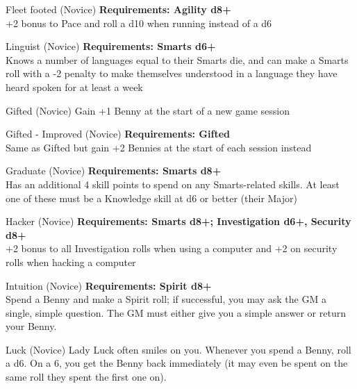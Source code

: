 \begin{multicols}{2}
\begin{genericsection}{Fleet footed (Novice)}
\textbf{Requirements: Agility d8+}\\
+2 bonus to Pace and roll a d10 when running instead of a d6
\end{genericsection}

\begin{genericsection}{Linguist (Novice)}
\textbf{Requirements: Smarts d6+}\\
Knows a number of languages equal to their Smarts die, and can make a Smarts roll with a -2 penalty to make themselves understood in a language they have heard spoken for at least a week
\end{genericsection}

\begin{genericsection}{Gifted (Novice)}
Gain +1 Benny at the start of a new game session
\end{genericsection}

\begin{genericsection}{Gifted - Improved (Novice)}
\textbf{Requirements: Gifted}\\
Same as Gifted but gain +2 Bennies at the start of each session instead
\end{genericsection}

\begin{genericsection}{Graduate (Novice)}
\textbf{Requirements: Smarts d8+}\\
Has an additional 4 skill points to spend on any Smarts-related skills. At least one of these must be a Knowledge skill at d6 or better (their Major)
\end{genericsection}

\begin{genericsection}{Hacker (Novice)}
\textbf{Requirements: Smarts d8+; Investigation d6+, Security d8+}\\
+2 bonus to all Investigation rolls when using a computer and +2 on security rolls when hacking a computer
\end{genericsection}

\begin{genericsection}{Intuition (Novice)}
\textbf{Requirements: Spirit d8+}\\
Spend a Benny and make a Spirit roll; if successful, you may ask the GM a single, simple question. The GM must either give you a simple answer or return your Benny.
\end{genericsection}

\begin{genericsection}{Luck (Novice)}
Lady Luck often smiles on you. Whenever you spend a Benny, roll a d6. On a 6, you get the Benny back immediately (it may even be spent on the same roll they spent the first one on).
\end{genericsection}


\end{multicols}
